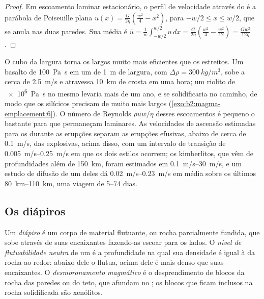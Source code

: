 \begin{proof}
Em escoamento laminar estacionário, o perfil de velocidade através do  é a parábola
de Poiseuille plana $u(x) = \frac{G}{2\eta}\left(\frac{w^2}{4} - x^2\right)$, para
$-w/2 \le x \le w/2$, que se anula nas duas paredes. Sua média é
$\bar u = \frac1w\int_{-w/2}^{w/2}u\,dx = \frac{G}{2\eta}\left(\frac{w^2}{4} -
\frac{w^2}{12}\right) = \frac{Gw^2}{12\eta}$.
\end{proof}

O cubo da largura torna os  largos muito mais eficientes que os estreitos. Um
basalto de \qty{100}{Pa.s} em um  de \qty{1}{m} de largura, com $\Delta\rho =
\qty{300}{kg/m^3}$, sobe a cerca de \qty{2.5}{m/s} e atravessa \qty{10}{km} de
crosta em uma hora; um riolito de \qty{e6}{Pa.s} no mesmo  levaria mais
de um ano, e se solidificaria no caminho, de modo que os  silícicos precisam de  muito mais
largos (\cref{exo:b2:magma-emplacement:6}). O número de Reynolds $\rho\bar u w/\eta$ desses escoamentos
é pequeno o bastante para que permaneçam laminares. As velocidades de ascensão estimadas para os 
durante as erupções separam as erupções efusivas, abaixo de cerca de \qty{0.1}{m/s}, das
explosivas, acima disso, com um intervalo de transição de \qtyrange{0.005}{0.25}{m/s}
em que os dois estilos ocorrem; os kimberlitos, que vêm de
profundidades além de \qty{150}{km}, foram estimados em \qtyrange{0.1}{30}{m/s}, e
um estudo de difusão de um deles dá \qtyrange{0.02}{0.23}{m/s} em média sobre
os últimos \qtyrange{80}{110}{km}, uma viagem de \numrange{5}{74} dias.

\subsection{Os diápiros}

\begin{definition}\label{def:b2:magma-emplacement:ascent}
Um \emph{diápiro} é um corpo de material flutuante,  ou rocha parcialmente
fundida, que sobe através de suas encaixantes fazendo-as escoar para os lados. O
\emph{nível de flutuabilidade neutra} de um  é a
profundidade na qual sua densidade é igual à da rocha ao redor: abaixo dele o
 flutua, acima dele é mais denso que suas encaixantes. O \emph{desmoronamento
magmático} é o desprendimento de blocos da rocha das paredes ou do
teto, que afundam no ; os blocos que ficam inclusos na rocha solidificada
são xenólitos.
\end{definition}

